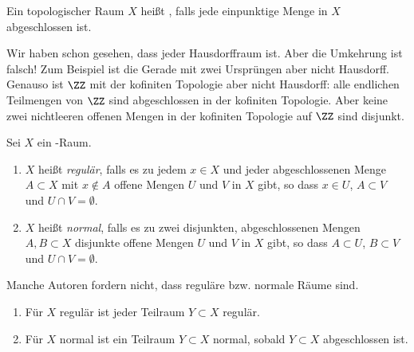 \begin{definition}
Ein topologischer Raum $X$ heißt \emph{\Tone}, falls jede einpunktige Menge in $X$ abgeschlossen ist.
\end{definition}

Wir haben schon gesehen, dass jeder Hausdorffraum \Tone ist. Aber die Umkehrung ist falsch! Zum Beispiel ist die Gerade mit zwei Ursprüngen \Tone aber nicht Hausdorff. Genauso ist $\ZZ$ mit der kofiniten Topologie \Tone aber nicht Hausdorff: alle endlichen Teilmengen von $\ZZ$ sind abgeschlossen in der kofiniten Topologie. Aber keine zwei nichtleeren offenen Mengen in der kofiniten Topologie auf $\ZZ$ sind disjunkt.

\begin{definition}
Sei $X$ ein \Tone-Raum.
\begin{enumerate}
\item $X$ heißt \emph{regulär}, falls es zu jedem $x\in X$ und jeder abgeschlossenen Menge $A\subset X$ mit $x\not\in A$ offene Mengen $U$ und $V$ in $X$ gibt, so dass $x\in U$, $A\subset V$ und $U\cap V = \emptyset$.
\item $X$ heißt \emph{normal}, falls es zu zwei disjunkten, abgeschlossenen Mengen $A,B\subset X$ disjunkte offene Mengen $U$ und $V$ in $X$ gibt, so dass $A\subset U$, $B\subset V$ und $U\cap V = \emptyset$.
\end{enumerate}
\end{definition}
Manche Autoren fordern nicht, dass reguläre bzw. normale Räume \Tone sind.

\begin{lemma}\label{lem:pf-urysohn}\leavevmode
\begin{enumerate}
\item Für $X$ regulär ist jeder Teilraum $Y\subset X$ regulär.
\item Für $X$ normal ist ein Teilraum $Y\subset X$ normal, sobald $Y\subset X$ abgeschlossen ist.\proofomitted
\end{enumerate}
\end{lemma}

